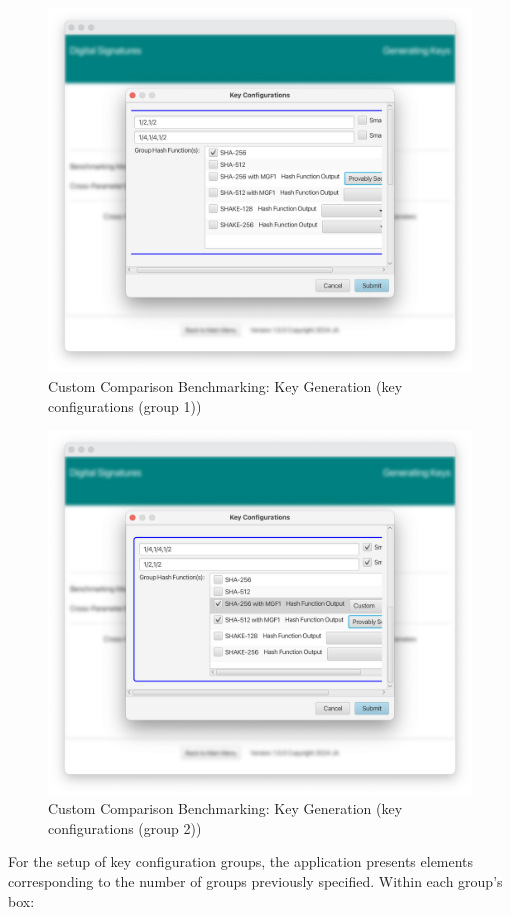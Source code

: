 \documentclass[]{final_report}
\begin{document}
\begin{figure}[H]
    \centering
    \includegraphics[width=\textwidth]{main_pictures/ui/custom4.png}
    \caption{Custom Comparison Benchmarking: Key Generation (key configurations (group 1))}
\end{figure}

\begin{figure}[H]
    \centering
    \includegraphics[width=\textwidth]{main_pictures/ui/custom5.png}
    \caption{Custom Comparison Benchmarking: Key Generation (key configurations (group 2))}
\end{figure}
For the setup of key configuration groups, the application presents elements corresponding to the number of groups previously specified. Within each group’s box:
\end{document}
